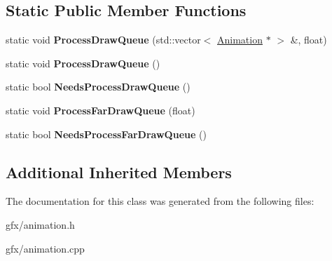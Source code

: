 \subsection*{Static Public Member Functions}
\begin{DoxyCompactItemize}
\item 
static void {\bfseries Process\+Draw\+Queue} (std\+::vector$<$ \hyperlink{classAnimation}{Animation} $\ast$ $>$ \&, float)\hypertarget{classAnimation_a56a07af49c37f8c27416925bedb5808c}{}\label{classAnimation_a56a07af49c37f8c27416925bedb5808c}

\item 
static void {\bfseries Process\+Draw\+Queue} ()\hypertarget{classAnimation_af455263b6b23701dce7a2407163e3718}{}\label{classAnimation_af455263b6b23701dce7a2407163e3718}

\item 
static bool {\bfseries Needs\+Process\+Draw\+Queue} ()\hypertarget{classAnimation_a3d1e91b8d8c791e442d96fd26443e317}{}\label{classAnimation_a3d1e91b8d8c791e442d96fd26443e317}

\item 
static void {\bfseries Process\+Far\+Draw\+Queue} (float)\hypertarget{classAnimation_abc9e911a591570dd3faee42ea1f931dc}{}\label{classAnimation_abc9e911a591570dd3faee42ea1f931dc}

\item 
static bool {\bfseries Needs\+Process\+Far\+Draw\+Queue} ()\hypertarget{classAnimation_a16fecba0e8d3c584ad7e9eba8afadd8d}{}\label{classAnimation_a16fecba0e8d3c584ad7e9eba8afadd8d}

\end{DoxyCompactItemize}
\subsection*{Additional Inherited Members}


The documentation for this class was generated from the following files\+:\begin{DoxyCompactItemize}
\item 
gfx/animation.\+h\item 
gfx/animation.\+cpp\end{DoxyCompactItemize}
